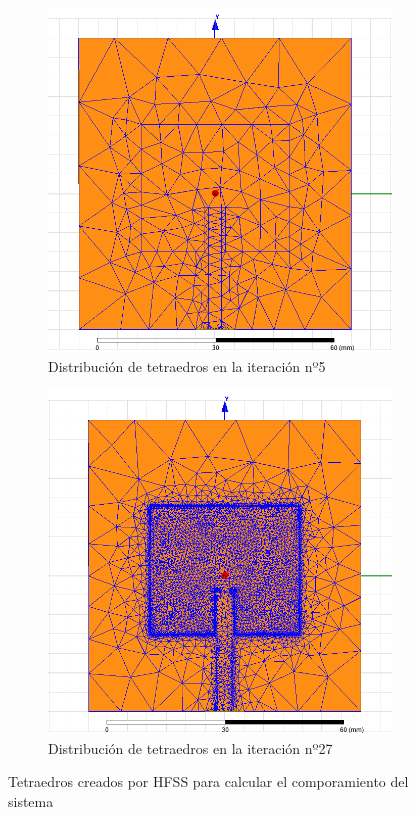 \begin{figure}[h]
     \centering
     \begin{subfigure}[b]{0.47\textwidth}
         \centering
         \includegraphics[width=\textwidth]{archivos/desarrollo/10a}
         \caption{Distribución de tetraedros en la iteración nº5}
         \label{fig:tetraa}
     \end{subfigure}
     \hfill
     \begin{subfigure}[b]{0.47\textwidth}
         \centering
         \includegraphics[width=\textwidth]{archivos/desarrollo/10b}
         \caption{Distribución de tetraedros en la iteración nº27}
         \label{fig:tetrab}
     \end{subfigure}
     \hfill
        \caption{Tetraedros creados por HFSS para calcular el comporamiento del sistema}
        \label{fig:tetra}
\end{figure}

